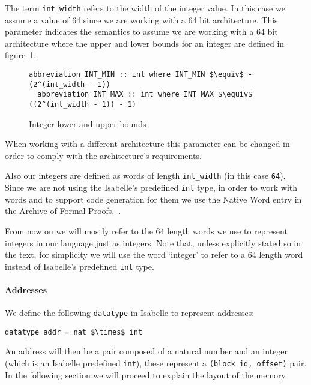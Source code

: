 The term \verb|int_width| refers to the width of the integer value.
In this case we assume a value of 64 since we are working with a 64 bit architecture.
This parameter indicates the semantics to assume we are working with a 64 bit architecture where the upper and lower bounds for an integer are defined in figure~\ref{fig:int_bounds}.

\begin{figure}
  \begin{lstlisting}[frame=single, mathescape=true]
  abbreviation INT_MIN :: int where INT_MIN $\equiv$ - (2^(int_width - 1))
  abbreviation INT_MAX :: int where INT_MAX $\equiv$  ((2^(int_width - 1)) - 1)
  \end{lstlisting}

  \caption{Integer lower and upper bounds}
  \label{fig:int_bounds}
\end{figure}

When working with a different architecture this parameter can be changed in order to comply with the architecture's requirements.

Also our integers are defined as words of length \verb|int_width| (in this case \verb|64|).
Since we are not using the Isabelle's predefined \verb|int| type, in order to work with words and to support code generation for them we use the Native Word entry in the Archive of Formal Proofs.~\parencite{Native_Word-AFP}.

From now on we will mostly refer to the 64 length words we use to represent integers in our language just as integers.
Note that, unless explicitly stated so in the text, for simplicity we will use the word `integer' to refer to a 64 length word instead of Isabelle's predefined \verb|int| type.

\paragraph{Addresses}

We define the following \verb|datatype| in Isabelle to represent addresses:

\begin{lstlisting}[frame=single, mathescape=true]
datatype addr = nat $\times$ int
\end{lstlisting}

An address will then be a pair composed of a natural number and an integer (which is an Isabelle predefined \verb|int|), these represent a \verb|(block_id, offset)| pair.
In the following section we will proceed to explain the layout of the memory.

